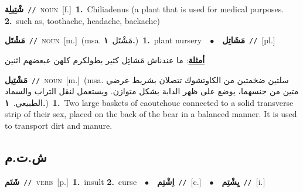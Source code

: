\documentclass[10pt,a4paper,twoside]{article} %
\begin{document}
\begin{multicols}{2}
{\setlength\topsep{0pt}\textbf{\foreignlanguage{arabic}{شْتِيلِة}}\ {\color{gray}\texttt{//}\color{black}}\ \textsc{noun}\ [f.]\ \textbf{1.}~Chiliadenus (a plant that is used for medical purposes.  \textbf{2.}~such as, toothache, headache, backache)\ } \vspace{2mm}

{\setlength\topsep{0pt}\textbf{\foreignlanguage{arabic}{مَشْتَل}}\ {\color{gray}\texttt{//}\color{black}}\ \textsc{noun}\ [m.]\ \color{gray}(msa. \foreignlanguage{arabic}{مَشْتَل}~\foreignlanguage{arabic}{\textbf{١.}})\color{black}\ \textbf{1.}~plant nursery\ \ $\bullet$\ \ \setlength\topsep{0pt}\textbf{\foreignlanguage{arabic}{مَشَاتِل}}\ {\color{gray}\texttt{//}\color{black}}\ [pl.]\  \begin{flushright}\color{gray}\foreignlanguage{arabic}{\textbf{\underline{\foreignlanguage{arabic}{أمثلة}}}: ما عندناش مَشاتِل كثير بطولكرم كلهن عبعضهم اثنين}\end{flushright}\color{black}} \vspace{2mm}

{\setlength\topsep{0pt}\textbf{\foreignlanguage{arabic}{مَشْتِيل}}\ {\color{gray}\texttt{//}\color{black}}\ \textsc{noun}\ [m.]\ \color{gray}(msa. \foreignlanguage{arabic}{سلتين ضخمتين من الكاوتشوك تتصلان بشريط عرضي متين من جنسهما، يوضع على ظهر الدابة بشكل متوازن. ويستعمل لنقل التراب والسماد الطبيعي.}~\foreignlanguage{arabic}{\textbf{١.}})\color{black}\ \textbf{1.}~Two large baskets of caoutchouc connected to a solid transverse strip of their sex, placed on the back of the bear in a balanced manner. It is used to transport dirt and manure.\ } \vspace{2mm}

\vspace{-3mm}
\subsection*{\color{blue}\foreignlanguage{arabic}{ش.ت.م}\color{blue}{}} 

{\setlength\topsep{0pt}\textbf{\foreignlanguage{arabic}{شَتَم}}\ {\color{gray}\texttt{//}\color{black}}\ \textsc{verb}\ [p.]\ \textbf{1.}~insult  \textbf{2.}~curse\ \ $\bullet$\ \ \setlength\topsep{0pt}\textbf{\foreignlanguage{arabic}{اِشْتِم}}\ {\color{gray}\texttt{//}\color{black}}\ [c.]\ \ $\bullet$\ \ \setlength\topsep{0pt}\textbf{\foreignlanguage{arabic}{يِشْتِم}}\ {\color{gray}\texttt{//}\color{black}}\ [i.]\ } \vspace{2mm}


\end{multicols}
\end{document}
